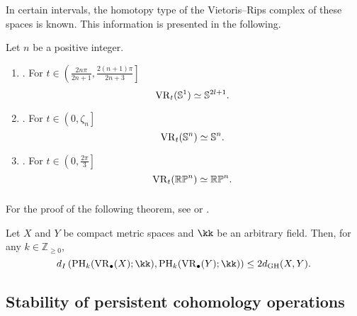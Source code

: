 In certain intervals, the homotopy type of the Vietoris--Rips complex of these spaces is known.
This information is presented in the following.

\begin{proposition}
	Let $n$ be a positive integer.
	\begin{enumerate}[{\rm (a)}]
		\item\label{prop:S1}{\rm \cite[Thm.~7.4]{adamaszek2017vietoris}.}
		For $t \in \left(\frac{2n\pi}{2n+1}, \frac{2(n+1)\pi}{2n+3}\right]$
		\[
		\operatorname{VR}_t(\mathbb{S}^1) \simeq \mathbb{S}^{2l+1}.
		\]

		\item\label{prop:Sn}{\rm \cite[Thm.~10]{lim2020vietoris}.}
		For $t \in \left(0, \zeta_n\right]$
		\[
		\operatorname{VR}_t(\mathbb{S}^n) \simeq \mathbb{S}^n.
		\]

		\item\label{prop:RPn}{\rm \cite[Thm.~4.5]{adams2022metric}.}
		For $t \in \left(0,\frac{2\pi}{3} \right]$
		\[
		\operatorname{VR}_t(\mathbb{RP}^n) \simeq \mathbb{RP}^n.
		\]
	\end{enumerate}
\end{proposition}

\subsubsection{} For the proof of the following theorem, see \cite{bib11} or \cite{bib13, bib14}.

\begin{theorem}
	Let $X$ and $Y$ be compact metric spaces and $\kk$ be an arbitrary field. Then, for any $k \in \mathbb{Z}_{\geq 0}$,
	\[
	d_I \left( \mathrm{PH}_k(\VR_{\bullet}(X); \kk), \mathrm{PH}_k(\VR_{\bullet}(Y); \kk) \right) \leq 2 d_{\mathrm{GH}}(X, Y).
	\]
\end{theorem}

\subsection{Stability of persistent cohomology operations}\label{ss:stability}

